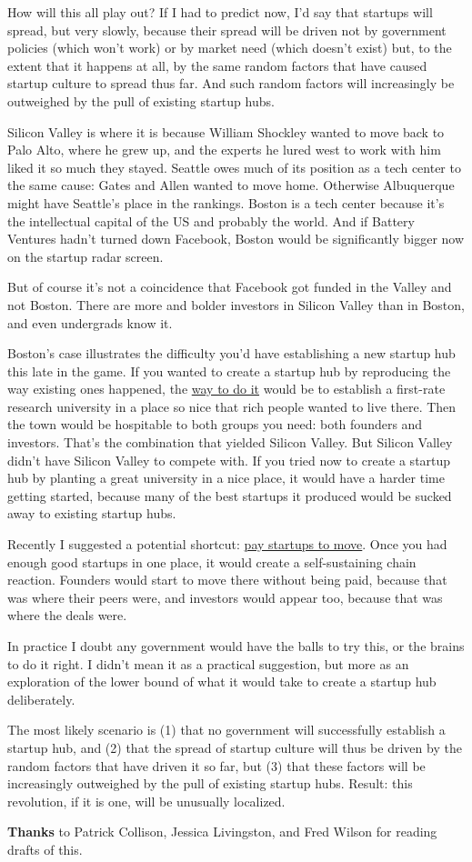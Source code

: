 How will this all play out? If I had to predict now, I'd say that
startups will spread, but very slowly, because their spread will be
driven not by government policies (which won't work) or by market need
(which doesn't exist) but, to the extent that it happens at all, by the
same random factors that have caused startup culture to spread thus far.
And such random factors will increasingly be outweighed by the pull of
existing startup hubs.

Silicon Valley is where it is because William Shockley wanted to move
back to Palo Alto, where he grew up, and the experts he lured west to
work with him liked it so much they stayed. Seattle owes much of its
position as a tech center to the same cause: Gates and Allen wanted to
move home. Otherwise Albuquerque might have Seattle's place in the
rankings. Boston is a tech center because it's the intellectual capital
of the US and probably the world. And if Battery Ventures hadn't turned
down Facebook, Boston would be significantly bigger now on the startup
radar screen.

But of course it's not a coincidence that Facebook got funded in the
Valley and not Boston. There are more and bolder investors in Silicon
Valley than in Boston, and even undergrads know it.

Boston's case illustrates the difficulty you'd have establishing a new
startup hub this late in the game. If you wanted to create a startup hub
by reproducing the way existing ones happened, the
\href{siliconvalley.html}{way to do it} would be to establish a
first-rate research university in a place so nice that rich people
wanted to live there. Then the town would be hospitable to both groups
you need: both founders and investors. That's the combination that
yielded Silicon Valley. But Silicon Valley didn't have Silicon Valley to
compete with. If you tried now to create a startup hub by planting a
great university in a nice place, it would have a harder time getting
started, because many of the best startups it produced would be sucked
away to existing startup hubs.

Recently I suggested a potential shortcut: \href{maybe.html}{pay
startups to move}. Once you had enough good startups in one place, it
would create a self-sustaining chain reaction. Founders would start to
move there without being paid, because that was where their peers were,
and investors would appear too, because that was where the deals were.

In practice I doubt any government would have the balls to try this, or
the brains to do it right. I didn't mean it as a practical suggestion,
but more as an exploration of the lower bound of what it would take to
create a startup hub deliberately.

The most likely scenario is (1) that no government will successfully
establish a startup hub, and (2) that the spread of startup culture will
thus be driven by the random factors that have driven it so far, but (3)
that these factors will be increasingly outweighed by the pull of
existing startup hubs. Result: this revolution, if it is one, will be
unusually localized.


\textbf{Thanks} to Patrick Collison, Jessica Livingston, and Fred Wilson
for reading drafts of this.